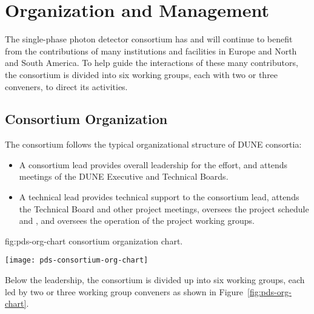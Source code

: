 \section{Organization and Management}
\label{sec:fdsp-pd-org}

The single-phase photon detector consortium has and will continue to benefit from the contributions of many institutions and facilities in Europe and North and South America.  To help guide the interactions of these many contributors, the consortium is divided into six working groups, each with two or three conveners, to direct its activities.  %

\subsection{Consortium Organization}
\label{sec:fdsp-pd-org-consortium}

The \single {} consortium follows the typical organizational structure of DUNE consortia:
\begin{itemize}
\item A consortium lead
provides overall leadership for the effort, and attends meetings of the DUNE Executive and Technical Boards.
\item A technical lead 
provides technical support to the consortium lead, attends the Technical Board and other project meetings, oversees the project schedule and , and oversees the operation of the project working groups.  
\end{itemize}

\begin{dunefigure}{fig:pds-org-chart}
{ consortium organization chart.}

	\texttt{[image: pds-consortium-org-chart]}
	
\end{dunefigure} 



Below the leadership, the consortium is divided up into six working groups, each led by two or three working group conveners as shown in Figure~\ref{fig:pds-org-chart}. 


